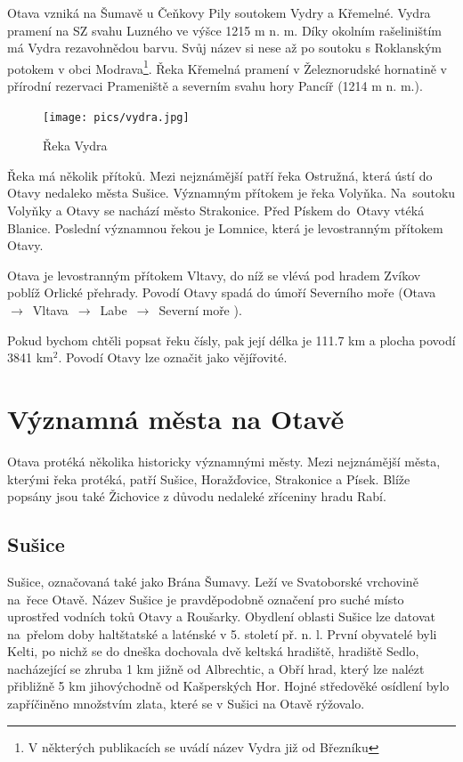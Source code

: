\documentclass[thesis=M,czech]{FITthesis}[2012/06/26]
\begin{document}
Otava vzniká na Šumavě u Čeňkovy Pily soutokem Vydry a Křemelné. Vydra pramení na SZ svahu Luzného ve výšce 1215 m n. m. Díky okolním rašeliništím má Vydra rezavohnědou barvu. Svůj název si nese až po soutoku s Roklanským potokem v obci Modrava\footnote{V některých publikacích se uvádí název Vydra již od Březníku}. Řeka Křemelná pramení v Železnorudské hornatině v přírodní rezervaci Prameniště a severním svahu hory Pancíř (1214 m n. m.). \cite{SMOOS}

\begin{figure}[h!]
	\centering
	\texttt{[image: pics/vydra.jpg]}
	\caption{Řeka Vydra}
	\label{obrazek:ot1}
\end{figure}

Řeka má několik přítoků. Mezi nejznámější patří řeka Ostružná, která ústí do Otavy nedaleko města Sušice. Významným přítokem je řeka Volyňka. Na~soutoku Volyňky a Otavy se nachází město Strakonice. Před Pískem do~Otavy vtéká Blanice. Poslední významnou řekou je Lomnice, která je levostranným přítokem Otavy. 

Otava je levostranným přítokem Vltavy, do níž se vlévá pod hradem Zvíkov poblíž Orlické přehrady. Povodí Otavy spadá do úmoří Severního moře (Otava~$\rightarrow$~Vltava~$\rightarrow$~Labe~$\rightarrow$~Severní moře ). 

Pokud bychom chtěli popsat řeku čísly, pak její délka je 111.7 km a plocha povodí 3841 km$^2$. Povodí Otavy lze označit jako vějířovité. 

\clearpage

\section{Významná města na Otavě}
Otava protéká několika historicky významnými městy. Mezi nejznámější města, kterými řeka protéká, patří Sušice, Horažďovice, Strakonice a Písek. Blíže popsány jsou také Žichovice z důvodu nedaleké zříceniny hradu Rabí.

\subsection{Sušice}
Sušice, označovaná také jako Brána Šumavy. Leží ve Svatoborské vrchovině na~řece Otavě. Název Sušice je pravděpodobně označení pro suché místo uprostřed vodních toků Otavy a Roušarky. Obydlení oblasti Sušice lze datovat na~přelom doby haltštatské a laténské v 5. století př. n. l. První obyvatelé byli Kelti, po nichž se do dneška dochovala dvě keltská hradiště, hradiště Sedlo, nacházející se zhruba 1 km jižně od Albrechtic, a Obří hrad, který lze nalézt přibližně 5 km jihovýchodně od Kašperských Hor. Hojné středověké osídlení bylo zapříčiněno množstvím zlata, které se v Sušici na Otavě rýžovalo. 
\end{document}
